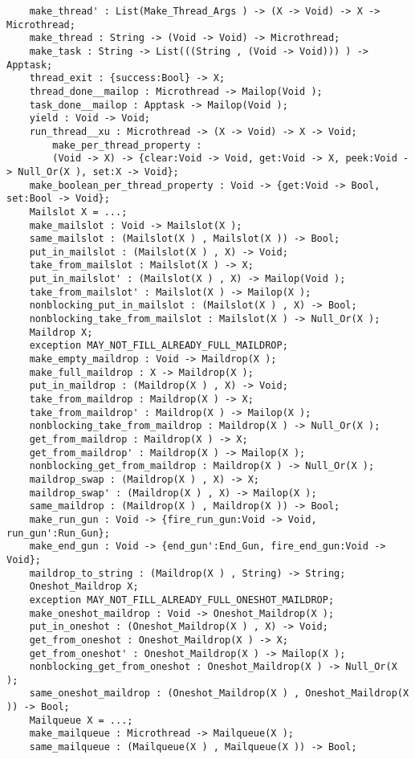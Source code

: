\begin{verbatim}
    make_thread' : List(Make_Thread_Args ) -> (X -> Void) -> X -> Microthread;
    make_thread : String -> (Void -> Void) -> Microthread;
    make_task : String -> List(((String , (Void -> Void))) ) -> Apptask;
    thread_exit : {success:Bool} -> X;
    thread_done__mailop : Microthread -> Mailop(Void );
    task_done__mailop : Apptask -> Mailop(Void );
    yield : Void -> Void;
    run_thread__xu : Microthread -> (X -> Void) -> X -> Void;
        make_per_thread_property :
        (Void -> X) -> {clear:Void -> Void, get:Void -> X, peek:Void -> Null_Or(X ), set:X -> Void};
    make_boolean_per_thread_property : Void -> {get:Void -> Bool, set:Bool -> Void};
    Mailslot X = ...;
    make_mailslot : Void -> Mailslot(X );
    same_mailslot : (Mailslot(X ) , Mailslot(X )) -> Bool;
    put_in_mailslot : (Mailslot(X ) , X) -> Void;
    take_from_mailslot : Mailslot(X ) -> X;
    put_in_mailslot' : (Mailslot(X ) , X) -> Mailop(Void );
    take_from_mailslot' : Mailslot(X ) -> Mailop(X );
    nonblocking_put_in_mailslot : (Mailslot(X ) , X) -> Bool;
    nonblocking_take_from_mailslot : Mailslot(X ) -> Null_Or(X );
    Maildrop X;
    exception MAY_NOT_FILL_ALREADY_FULL_MAILDROP;
    make_empty_maildrop : Void -> Maildrop(X );
    make_full_maildrop : X -> Maildrop(X );
    put_in_maildrop : (Maildrop(X ) , X) -> Void;
    take_from_maildrop : Maildrop(X ) -> X;
    take_from_maildrop' : Maildrop(X ) -> Mailop(X );
    nonblocking_take_from_maildrop : Maildrop(X ) -> Null_Or(X );
    get_from_maildrop : Maildrop(X ) -> X;
    get_from_maildrop' : Maildrop(X ) -> Mailop(X );
    nonblocking_get_from_maildrop : Maildrop(X ) -> Null_Or(X );
    maildrop_swap : (Maildrop(X ) , X) -> X;
    maildrop_swap' : (Maildrop(X ) , X) -> Mailop(X );
    same_maildrop : (Maildrop(X ) , Maildrop(X )) -> Bool;
    make_run_gun : Void -> {fire_run_gun:Void -> Void, run_gun':Run_Gun};
    make_end_gun : Void -> {end_gun':End_Gun, fire_end_gun:Void -> Void};
    maildrop_to_string : (Maildrop(X ) , String) -> String;
    Oneshot_Maildrop X;
    exception MAY_NOT_FILL_ALREADY_FULL_ONESHOT_MAILDROP;
    make_oneshot_maildrop : Void -> Oneshot_Maildrop(X );
    put_in_oneshot : (Oneshot_Maildrop(X ) , X) -> Void;
    get_from_oneshot : Oneshot_Maildrop(X ) -> X;
    get_from_oneshot' : Oneshot_Maildrop(X ) -> Mailop(X );
    nonblocking_get_from_oneshot : Oneshot_Maildrop(X ) -> Null_Or(X );
    same_oneshot_maildrop : (Oneshot_Maildrop(X ) , Oneshot_Maildrop(X )) -> Bool;
    Mailqueue X = ...;
    make_mailqueue : Microthread -> Mailqueue(X );
    same_mailqueue : (Mailqueue(X ) , Mailqueue(X )) -> Bool;

\end{verbatim}
